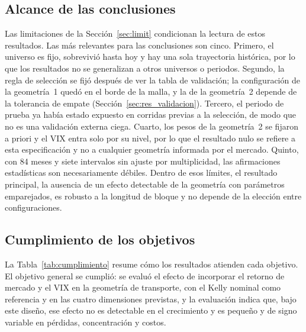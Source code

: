 \subsection{Alcance de las conclusiones}\label{sec:disc_alcance}

Las limitaciones de la Sección~\ref{sec:limit} condicionan la lectura de estos resultados. Las más relevantes para las conclusiones son cinco. Primero, el universo es fijo, sobrevivió hasta hoy y hay una sola trayectoria histórica, por lo que los resultados no se generalizan a otros universos o periodos. Segundo, la regla de selección se fijó después de ver la tabla de validación; la configuración de la geometría~1 quedó en el borde de la malla, y la de la geometría~2 depende de la tolerancia de empate (Sección~\ref{sec:res_validacion}). Tercero, el periodo de prueba ya había estado expuesto en corridas previas a la selección, de modo que no es una validación externa ciega. Cuarto, los pesos de la geometría~2 se fijaron a priori y el VIX entra solo por su nivel, por lo que el resultado nulo se refiere a esta especificación y no a cualquier geometría informada por el mercado. Quinto, con 84 meses y siete intervalos sin ajuste por multiplicidad, las afirmaciones estadísticas son necesariamente débiles. Dentro de esos límites, el resultado principal, la ausencia de un efecto detectable de la geometría con parámetros emparejados, es robusto a la longitud de bloque y no depende de la elección entre configuraciones.

\subsection{Cumplimiento de los objetivos}\label{sec:disc_objetivos}

La Tabla~\ref{tab:cumplimiento} resume cómo los resultados atienden cada objetivo. El objetivo general se cumplió: se evaluó el efecto de incorporar el retorno de mercado y el VIX en la geometría de transporte, con el Kelly nominal como referencia y en las cuatro dimensiones previstas, y la evaluación indica que, bajo este diseño, ese efecto no es detectable en el crecimiento y es pequeño y de signo variable en pérdidas, concentración y costos.

